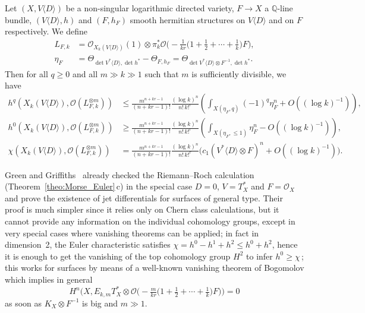 \documentclass[AHL,Unicode,longabstracts,published]{cedram}
\newcommand*\cO{\mathcal{O}}
\newcommand*\bQ{\mathbb{Q}}
\let\leq\leqslant
\let\geq\geqslant
\begin{document}
\begin{theo}\label{theo:Morse_Euler}
Let $(X,V\langle D\rangle)$ be a non-singular logarithmic directed variety,
$F\to X$ a $\bQ$-line bundle,
$(V\langle D\rangle,h)$ and $(F,h_F)$ smooth hermitian structures on $V\langle D\rangle$ and on $F$ respectively. We define
\begin{align*}
L_{F,k}&=\cO_{X_k(V\langle D\rangle)}(1)\otimes
\pi_k^*\cO\Big(-\tfrac{1}{ kr}\Big(1+\tfrac{1}{ 2}+\cdots+\tfrac{1}{ k}\Big)F\Big),\\
\eta_F&=\Theta_{\det V^*\langle D\rangle,\det h^*}-\Theta_{F,h_F} =
\Theta_{\det V^*\langle D\rangle\otimes F^{-1},\det h^*}.
\end{align*}
Then for all $q\geq 0$ and all $m\gg k\gg 1$ such that
$m$ is sufficiently divisible, we have
\begin{align*}
\tag{a} h^q(X_k(V\langle D\rangle),\cO(L_{F,k}^{\otimes m})) &\leq \tfrac{m^{n+kr-1}}{ (n+kr-1)!}\tfrac{(\log k)^n}{ n!\,k!^r}\left(
\int_{X(\eta_F,q)}(-1)^q\eta_F^n+O\left((\log k)^{-1}\right)\right),
\\
\tag{b} h^0(X_k(V\langle D\rangle),\cO(L_{F,k}^{\otimes m})) &\geq \tfrac{m^{n+kr-1}}{ (n+kr-1)!}
\tfrac{(\log k)^n}{ n!\,k!^r}\left(
\int_{X(\eta_F,\leq 1)}\eta_F^n-O\left((\log k)^{-1}\right)\right),
\\
\tag{c}
\chi(X_k(V\langle D\rangle),\cO(L_{F,k}^{\otimes m}))&=\tfrac{m^{n+kr-1}}{ (n+kr-1)!}
\tfrac{(\log k)^n}{ n!\,k!^r}\big(c_1(V^*\langle D\rangle\otimes F)^n+O\left((\log k)^{-1}\right)\big).
\end{align*}
\end{theo}

Green and Griffiths~\cite{GG80} already checked the Riemann--Roch calculation (Theorem~\ref{theo:Morse_Euler}$\,$c) in the special case $D=0$, $V=T_X^*$ and $F=\cO_X$ and prove the existence of jet differentials for surfaces of general type. Their proof is much simpler since it relies only on Chern class calculations, but it cannot provide any information on the individual cohomology groups, except in very special cases where vanishing theorems can be applied; in fact in dimension~2, the Euler characteristic satisfies $\chi=h^0-h^1+h^2\le h^0+h^2$, hence it is enough to get the vanishing of the top cohomology group
$H^2$ to infer $h^0\geq\chi\,$; this works for surfaces by means of a well-known vanishing theorem of Bogomolov which implies in general
\[
H^n\bigg(X, E_{k,m} T_X^*
\otimes
\cO\Big(-\tfrac{m}{kr}\Big(1+\tfrac{1}{2}+\dotsb+\tfrac{1}{k}\Big)F\Big)
\bigg) = 0
\]
as soon as $K_X\otimes F^{-1}$ is big and $m\gg 1$.
\end{document}
